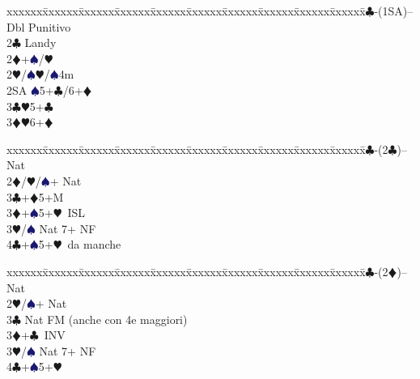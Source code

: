 \documentclass[a4paper,italian]{article}
\newcommand{\BC}{\textcolor{OliveGreen}{$\clubsuit$}}
\newcommand{\BD}{\textcolor{RedOrange}{$\vardiamondsuit$}}
\newcommand{\BH}{\textcolor{Red2}{$\varheartsuit${}}}
\newcommand{\BS}{\textcolor{MidnightBlue}{$\spadesuit${}}}
\newenvironment{bidtable}
{\begin{tabbing}

    xxxxxx\=xxxxxx\=xxxxxx\=xxxxxx\=xxxxxx\=xxxxxx\=xxxxxx\=xxxxxx\=xxxxxx\=xxxxxx\=\kill}
{\end{tabbing} }%
\begin{document}
\begin{multicols}{2}
                                        \begin{bidtable}
                                            1\BC-(1SA)--\+\\
                                            Dbl \> Punitivo\\
                                            2\BC \> Landy\\
                                            2\BD {}+\BS /\BH \\
                                            2\BH/\BS {}\BH/\BS 4m\\
                                            2SA \BS 5+\BC /6+\BD \\
                                            3\BC {}\BH 5+\BC \\
                                            3\BD {}\BH 6+\BD \-
                                        \end{bidtable}
                                        \bigbreak
                                        \begin{bidtable}
                                            1\BC-(2\BC)-- \> \> Nat\+\\
                                            2\BD/\BH/\BS {}+ Nat\\
                                            3\BC {}+\BD 5+M\\
                                            3\BD {}+\BS 5+\BH\ ISL\\
                                            3\BH/\BS \> Nat 7+ NF\\
                                            4\BC {}+\BS 5+\BH\ da manche\-
                                        \end{bidtable}
                                        \bigbreak
                                        \begin{bidtable}
                                            1\BC-(2\BD)-- \> \> Nat\+\\
                                            2\BH/\BS {}+ Nat\\
                                            3\BC \> Nat FM (anche con 4e maggiori)\\
                                            3\BD {}+\BC\ INV\\
                                            3\BH/\BS \> Nat 7+ NF\\
                                            4\BC {}+\BS 5+\BH \-

\end{bidtable}
\end{multicols}
\end{document}
